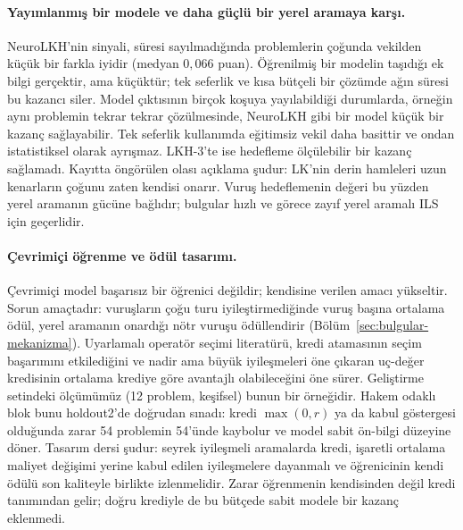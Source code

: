 \documentclass[pdflatex,sn-basic]{sn-jnl}
\begin{document}
\paragraph{Yayımlanmış bir modele ve daha güçlü bir yerel aramaya karşı.}
NeuroLKH'nin sinyali, süresi sayılmadığında problemlerin çoğunda vekilden küçük bir farkla iyidir
(medyan $0{,}066$ puan). Öğrenilmiş bir modelin taşıdığı ek bilgi gerçektir, ama küçüktür; tek
seferlik ve kısa bütçeli bir çözümde ağın süresi bu kazancı siler. Model çıktısının birçok koşuya
yayılabildiği durumlarda, örneğin aynı problemin tekrar tekrar çözülmesinde, NeuroLKH gibi bir
model küçük bir kazanç sağlayabilir. Tek seferlik kullanımda eğitimsiz vekil daha basittir ve
ondan istatistiksel olarak ayrışmaz.
LKH-3'te ise hedefleme ölçülebilir bir kazanç sağlamadı. Kayıtta öngörülen olası açıklama şudur:
LK'nin derin hamleleri uzun kenarların çoğunu zaten kendisi onarır. Vuruş hedeflemenin değeri bu
yüzden yerel aramanın gücüne bağlıdır; bulgular hızlı ve görece zayıf yerel aramalı ILS için
geçerlidir.

\paragraph{Çevrimiçi öğrenme ve ödül tasarımı.}
Çevrimiçi model başarısız bir öğrenici değildir; kendisine verilen amacı yükseltir. Sorun amaçtadır:
vuruşların çoğu turu iyileştirmediğinde vuruş başına ortalama ödül, yerel aramanın onardığı nötr
vuruşu ödüllendirir (Bölüm~\ref{sec:bulgular-mekanizma}). Uyarlamalı operatör seçimi literatürü, kredi atamasının seçim başarımını etkilediğini \citep{fialho_2010_aos} ve nadir ama büyük iyileşmeleri öne çıkaran uç-değer kredisinin ortalama krediye göre avantajlı olabileceğini \citep{fialho_2008_extreme} öne sürer. Geliştirme setindeki ölçümümüz (12 problem, keşifsel) bunun bir örneğidir. Hakem odaklı blok bunu
holdout2'de doğrudan sınadı: kredi $\max(0,r)$ ya da kabul göstergesi olduğunda zarar 54 problemin
54'ünde kaybolur ve model sabit ön-bilgi düzeyine döner. Tasarım dersi şudur: seyrek iyileşmeli
aramalarda kredi, işaretli ortalama maliyet değişimi yerine kabul edilen iyileşmelere dayanmalı ve
öğrenicinin kendi ödülü son kaliteyle birlikte izlenmelidir. Zarar öğrenmenin kendisinden değil
kredi tanımından gelir; doğru krediyle de bu bütçede sabit modele bir kazanç eklenmedi.
\end{document}
